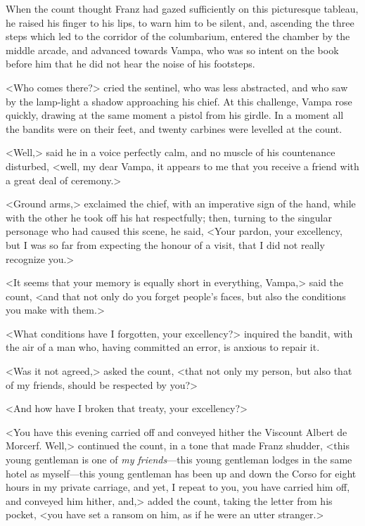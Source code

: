  When the count thought Franz had gazed sufficiently on this picturesque tableau, he raised his finger to his lips, to warn him to be silent, and, ascending the three steps which led to the corridor of the columbarium, entered the chamber by the middle arcade, and advanced towards Vampa, who was so intent on the book before him that he did not hear the noise of his footsteps. 

 <Who comes there?> cried the sentinel, who was less abstracted, and who saw by the lamp-light a shadow approaching his chief. At this challenge, Vampa rose quickly, drawing at the same moment a pistol from his girdle. In a moment all the bandits were on their feet, and twenty carbines were levelled at the count. 

 <Well,> said he in a voice perfectly calm, and no muscle of his countenance disturbed, <well, my dear Vampa, it appears to me that you receive a friend with a great deal of ceremony.>

<Ground arms,> exclaimed the chief, with an imperative sign of the hand, while with the other he took off his hat respectfully; then, turning to the singular personage who had caused this scene, he said, <Your pardon, your excellency, but I was so far from expecting the honour of a visit, that I did not really recognize you.> 

 <It seems that your memory is equally short in everything, Vampa,> said the count, <and that not only do you forget people's faces, but also the conditions you make with them.> 

 <What conditions have I forgotten, your excellency?> inquired the bandit, with the air of a man who, having committed an error, is anxious to repair it. 

 <Was it not agreed,> asked the count, <that not only my person, but also that of my friends, should be respected by you?> 

 <And how have I broken that treaty, your excellency?> 

 <You have this evening carried off and conveyed hither the Viscount Albert de Morcerf. Well,> continued the count, in a tone that made Franz shudder, <this young gentleman is one of \textit{my friends}—this young gentleman lodges in the same hotel as myself—this young gentleman has been up and down the Corso for eight hours in my private carriage, and yet, I repeat to you, you have carried him off, and conveyed him hither, and,> added the count, taking the letter from his pocket, <you have set a ransom on him, as if he were an utter stranger.> 

